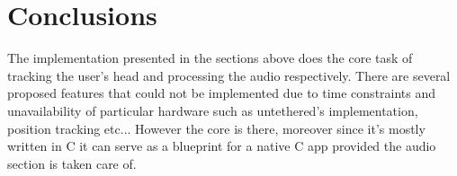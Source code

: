 \documentclass[a4paper,12pt,oneside]{article}
\begin{document}
\section{Conclusions}

The implementation presented in the sections above does the core task of tracking the user's head and processing the audio respectively. There are several proposed features that could not be implemented due to time constraints and unavailability of particular hardware such as untethered's implementation, position tracking etc... However the core is there, moreover since it's mostly written in C it can serve as a blueprint for a native C app provided the audio section is taken care of.  

\nocite{ard1}
    
  \newpage
  
  
  
  
  
\end{document}

